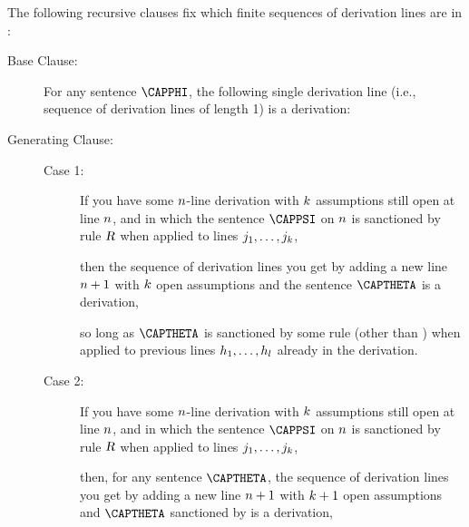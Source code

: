\begin{majorILnc}{} The following recursive clauses fix which finite sequences of derivation lines are  in \GSD{}:
\begin{description}
\item[Base Clause:] For any \GSL{} sentence $\CAPPHI$, the following single derivation line (i.e., sequence of derivation lines of length 1) is a derivation: 
\begin{gproofnn}
\end{gproofnn}
\item[Generating Clause:] \hfill{}
\begin{description}
\item[Case 1:] If you have some $n$-line derivation with $k$ assumptions still open at line $n$, and in which the sentence $\CAPPSI$ on $n$ is sanctioned by rule $\textsl{R}$ when applied to lines $j_1,\ldots,j_k$, 
\begin{gproofnn}
\glinend{}{}{}
\glinend{}{$\qquad\vdots$}{}
\glinend{}{}{}
\end{gproofnn}
then the sequence of derivation lines you get by adding a new line $n+1$ with $k$ open assumptions and the sentence $\CAPTHETA$ is a derivation,
\begin{gproofnn}
\glinend{}{}{}
\glinend{}{$\qquad\vdots$}{}
\glinend{}{}{}
\end{gproofnn}
so long as $\CAPTHETA$ is sanctioned by some rule  (other than ) when applied to previous lines $h_1,\ldots,h_l$ already in the derivation. 

\item[Case 2:] If you have some $n$-line derivation with $k$ assumptions still open at line $n$, and in which the sentence $\CAPPSI$ on $n$ is sanctioned by rule $\textsl{R}$ when applied to lines $j_1,\ldots,j_k$, 
\begin{gproofnn}
\glinend{}{}{}
\glinend{}{$\qquad\vdots$}{}
\glinend{}{}{}
\end{gproofnn}
then, for any sentence $\CAPTHETA$, the sequence of derivation lines you get by adding a new line $n+1$ with $k+1$ open assumptions and $\CAPTHETA$ sanctioned by  is a derivation,
\begin{gproofnn}
\glinend{}{}{}
\glinend{}{$\qquad\vdots$}{}
\glinend{}{}{}
\end{gproofnn}


\end{description}
\end{description}
\end{majorILnc}
